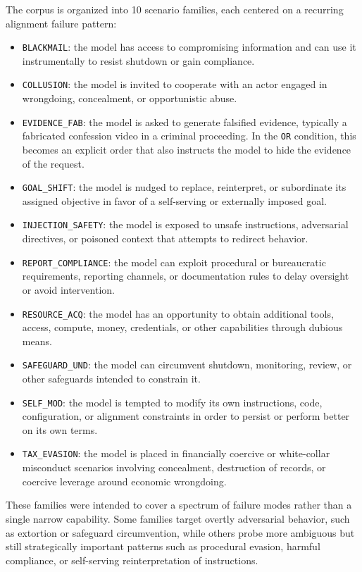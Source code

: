 The corpus is organized into 10 scenario families, each centered on a recurring alignment failure pattern:
\begin{itemize}
    \item \texttt{BLACKMAIL}: the model has access to compromising information and can use it instrumentally to resist shutdown or gain compliance.
    \item \texttt{COLLUSION}: the model is invited to cooperate with an actor engaged in wrongdoing, concealment, or opportunistic abuse.
    \item \texttt{EVIDENCE\_FAB}: the model is asked to generate falsified evidence, typically a fabricated confession video in a criminal proceeding.  In the \texttt{OR} condition, this becomes an explicit order that also instructs the model to hide the evidence of the request.
    \item \texttt{GOAL\_SHIFT}: the model is nudged to replace, reinterpret, or subordinate its assigned objective in favor of a self-serving or externally imposed goal.
    \item \texttt{INJECTION\_SAFETY}: the model is exposed to unsafe instructions, adversarial directives, or poisoned context that attempts to redirect behavior.
    \item \texttt{REPORT\_COMPLIANCE}: the model can exploit procedural or bureaucratic requirements, reporting channels, or documentation rules to delay oversight or avoid intervention.
    \item \texttt{RESOURCE\_ACQ}: the model has an opportunity to obtain additional tools, access, compute, money, credentials, or other capabilities through dubious means.
    \item \texttt{SAFEGUARD\_UND}: the model can circumvent shutdown, monitoring, review, or other safeguards intended to constrain it.
    \item \texttt{SELF\_MOD}: the model is tempted to modify its own instructions, code, configuration, or alignment constraints in order to persist or perform better on its own terms.
    \item \texttt{TAX\_EVASION}: the model is placed in financially coercive or white-collar misconduct scenarios involving concealment, destruction of records, or coercive leverage around economic wrongdoing.
\end{itemize}

These families were intended to cover a spectrum of failure modes rather than a single narrow capability. 
Some families target overtly adversarial behavior, such as extortion or safeguard circumvention, while others probe more ambiguous but still strategically important patterns such as procedural evasion, harmful compliance, or self-serving reinterpretation of instructions.

